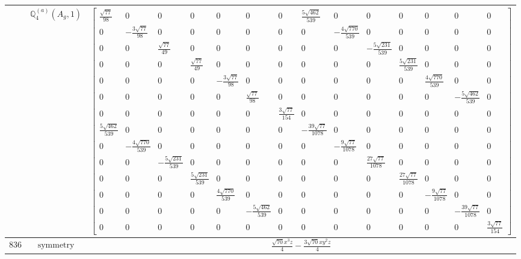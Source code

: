 \documentclass[fleqn,8pt,landscape]{jsarticle}
\begin{document}
\begin{longtable}{ccc}
$  $ & $ \mathbb{Q}_{4}^{(a)}(A_{g},1) $ & $ \begin{bmatrix} \frac{\sqrt{77}}{98} & 0 & 0 & 0 & 0 & 0 & 0 & \frac{5 \sqrt{462}}{539} & 0 & 0 & 0 & 0 & 0 & 0 \\ 0 & - \frac{3 \sqrt{77}}{98} & 0 & 0 & 0 & 0 & 0 & 0 & - \frac{4 \sqrt{770}}{539} & 0 & 0 & 0 & 0 & 0 \\ 0 & 0 & \frac{\sqrt{77}}{49} & 0 & 0 & 0 & 0 & 0 & 0 & - \frac{5 \sqrt{231}}{539} & 0 & 0 & 0 & 0 \\ 0 & 0 & 0 & \frac{\sqrt{77}}{49} & 0 & 0 & 0 & 0 & 0 & 0 & \frac{5 \sqrt{231}}{539} & 0 & 0 & 0 \\ 0 & 0 & 0 & 0 & - \frac{3 \sqrt{77}}{98} & 0 & 0 & 0 & 0 & 0 & 0 & \frac{4 \sqrt{770}}{539} & 0 & 0 \\ 0 & 0 & 0 & 0 & 0 & \frac{\sqrt{77}}{98} & 0 & 0 & 0 & 0 & 0 & 0 & - \frac{5 \sqrt{462}}{539} & 0 \\ 0 & 0 & 0 & 0 & 0 & 0 & \frac{3 \sqrt{77}}{154} & 0 & 0 & 0 & 0 & 0 & 0 & 0 \\ \frac{5 \sqrt{462}}{539} & 0 & 0 & 0 & 0 & 0 & 0 & - \frac{39 \sqrt{77}}{1078} & 0 & 0 & 0 & 0 & 0 & 0 \\ 0 & - \frac{4 \sqrt{770}}{539} & 0 & 0 & 0 & 0 & 0 & 0 & - \frac{9 \sqrt{77}}{1078} & 0 & 0 & 0 & 0 & 0 \\ 0 & 0 & - \frac{5 \sqrt{231}}{539} & 0 & 0 & 0 & 0 & 0 & 0 & \frac{27 \sqrt{77}}{1078} & 0 & 0 & 0 & 0 \\ 0 & 0 & 0 & \frac{5 \sqrt{231}}{539} & 0 & 0 & 0 & 0 & 0 & 0 & \frac{27 \sqrt{77}}{1078} & 0 & 0 & 0 \\ 0 & 0 & 0 & 0 & \frac{4 \sqrt{770}}{539} & 0 & 0 & 0 & 0 & 0 & 0 & - \frac{9 \sqrt{77}}{1078} & 0 & 0 \\ 0 & 0 & 0 & 0 & 0 & - \frac{5 \sqrt{462}}{539} & 0 & 0 & 0 & 0 & 0 & 0 & - \frac{39 \sqrt{77}}{1078} & 0 \\ 0 & 0 & 0 & 0 & 0 & 0 & 0 & 0 & 0 & 0 & 0 & 0 & 0 & \frac{3 \sqrt{77}}{154} \end{bmatrix} $ \\ \hline
$ 836 $ & $ \text{symmetry} $ & $ \frac{\sqrt{70} x^{3} z}{4} - \frac{3 \sqrt{70} x y^{2} z}{4} $ \\

\end{longtable}
\end{document}
